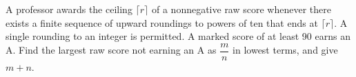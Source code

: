 A professor awards the ceiling $\lceil r\rceil$ of a nonnegative raw score whenever there exists a finite sequence of upward roundings to powers of ten that ends at $\lceil r\rceil$. A single rounding to an integer is permitted. A marked score of at least 90 earns an A. Find the largest raw score not earning an A as $\dfrac{m}{n}$ in lowest terms, and give $m+n$.
